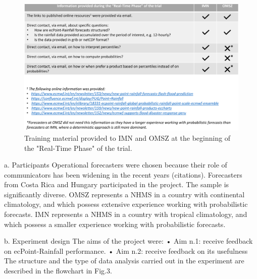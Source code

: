 \documentclass[twocol]{ametsocV5} %
\begin{document}
\begin{figure}
\centerline{\includegraphics[width=39pc]{manuscript/Figures/Methods_Remote_Training.png}}
\caption{Training material provided to IMN and OMSZ at the beginning of the "Real-Time Phase" of the trial.}
\label{Remote_Training}
\end{figure}
 
a.	Participants
Operational forecasters were chosen because their role of communicators has been widening in the recent years (citations).
Forecasters from Costa Rica and Hungary participated in the project. The sample is significantly diverse. OMSZ represents a NHMS in a country with continental climatology, and which possess extensive experience working with probabilistic forecasts. IMN represents a NHMS in a country with tropical climatology, and which possess a smaller experience working with probabilistic forecasts. 

b.	Experiment design
The aims of the project were:
•	Aim n.1: receive feedback on ecPoint-Rainfall performance. 
•	Aim n.2: receive feedback on its usefulness
The structure and the type of data analysis carried out in the experiment are described in the flowchart in Fig.3.
\end{document}
